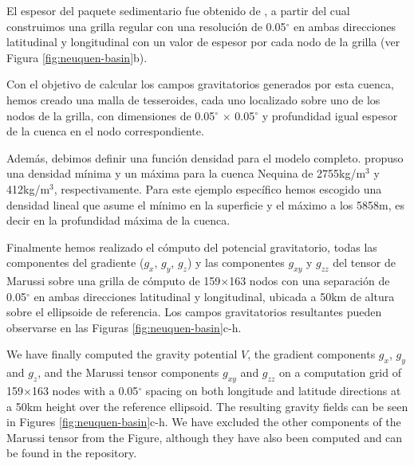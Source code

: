 \documentclass[a4paper,10pt]{article}
\begin{document}
El espesor del paquete sedimentario fue obtenido de \citet{Heine2007}, a partir del cual construimos una grilla regular con una resolución de 0.05$^\circ$ en ambas direcciones latitudinal y longitudinal con un valor de espesor por cada nodo de la grilla (ver Figura \ref{fig:neuquen-basin}b).

Con el objetivo de calcular los campos gravitatorios generados por esta cuenca, hemos creado una malla de tesseroides, cada uno localizado sobre uno de los nodos de la grilla, con dimensiones de 0.05$^\circ$ $\times$ 0.05$^\circ$ y profundidad igual espesor de la cuenca en el nodo correspondiente.

Además, debimos definir una función densidad para el modelo completo.
\citet{Sigismondi2012} propuso una densidad mínima y un máxima para la cuenca Nequina de 2755kg/m$^3$ y 412kg/m$^3$, respectivamente.
Para este ejemplo específico hemos escogido una densidad lineal que asume el mínimo en la superficie y el máximo a los 5858m, es decir en la profundidad máxima de la cuenca.

Finalmente hemos realizado el cómputo del potencial gravitatorio, todas las componentes del gradiente ($g_x$, $g_y$, $g_z$) y las componentes $g_{xy}$ y $g_{zz}$ del tensor de Marussi sobre una grilla de cómputo de 159$\times$163 nodos con una separación de 0.05$^\circ$ en ambas direcciones latitudinal y longitudinal, ubicada a 50km de altura sobre el ellipsoide de referencia.
Los campos gravitatorios resultantes pueden observarse en las Figuras \ref{fig:neuquen-basin}c-h.


We have finally computed the gravity potential $V$, the gradient components $g_x$, $g_y$ and $g_z$, and the Marussi tensor components $g_{xy}$ and $g_{zz}$ on a computation grid of 159$\times$163 nodes with a 0.05$^\circ$ spacing on both longitude and latitude directions at a 50km height over the reference ellipsoid.
The resulting gravity fields can be seen in Figures \ref{fig:neuquen-basin}c-h.
We have excluded the other components of the Marussi tensor from the Figure, although they have also been computed and can be found in the repository.





\end{document}
